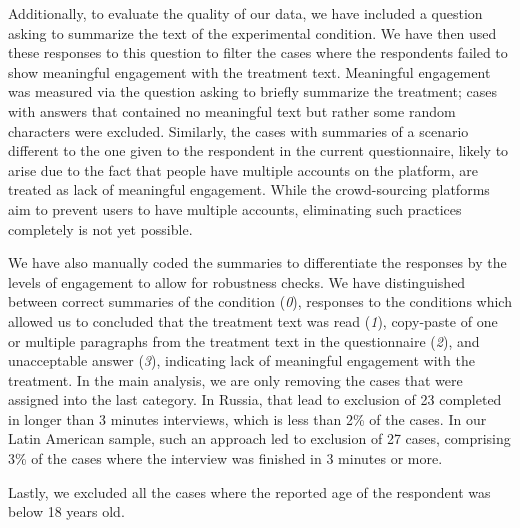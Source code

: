 \documentclass[11pt, ngerman,english,a4]{article}
\begin{document}
Additionally, to evaluate the quality of our data, we have included a question asking to summarize the text of the experimental condition. We have then used these responses to this question to filter the cases where the respondents failed to show meaningful engagement with the treatment text. Meaningful engagement was measured via the question asking to briefly summarize the treatment; cases with answers that contained no meaningful text but rather some random characters were excluded. Similarly, the cases with summaries of a scenario different to the one given to the respondent in the current questionnaire, likely to arise due to the fact that people have multiple accounts on the platform, are treated as lack of meaningful engagement.  While the crowd-sourcing platforms aim to prevent users to have multiple accounts, eliminating such practices completely is not yet possible. 

We have also manually coded the summaries to differentiate the responses by the levels of engagement to allow for robustness checks. We have distinguished between correct summaries of the condition (\textit{0}), responses to the conditions which allowed us to concluded that the treatment text was read (\textit{1}), copy-paste of one or multiple paragraphs from the treatment text in the questionnaire (\textit{2}), and unacceptable answer (\textit{3}), indicating lack of meaningful engagement with the treatment. In the main analysis, we are only removing the cases that were assigned into the last category.  In Russia, that lead to exclusion of 23 completed in longer than 3 minutes interviews, which is less than 2\% of the cases. In our Latin American sample, such an approach led to exclusion of 27 cases, comprising 3\% of the cases where the interview was finished in 3 minutes or more. 

Lastly, we excluded all the cases where the reported age of the respondent was below 18 years old. 


\end{document}
